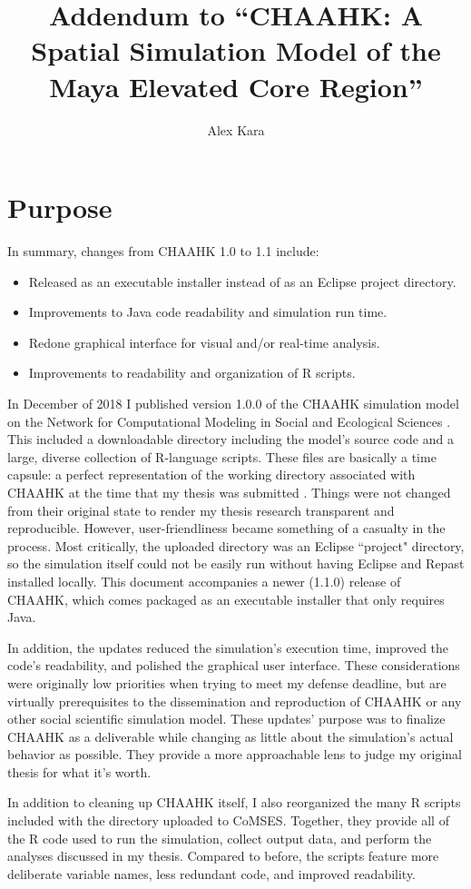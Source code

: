 \documentclass{article}
\title{Addendum to ``CHAAHK: A Spatial Simulation Model of the Maya
		Elevated Core Region''}
\author{Alex Kara}
\begin{document}
\maketitle
\section{Purpose}
In summary, changes from CHAAHK 1.0 to 1.1 include:
\begin{itemize}
	\item Released as an executable installer instead of as an Eclipse project directory.
	\item Improvements to Java code readability and simulation run time.
	\item Redone graphical interface for visual and/or real-time analysis.
	\item Improvements to readability and organization of R scripts.
\end{itemize}
\par In December of 2018 I published version 1.0.0 of the CHAAHK simulation model on the Network for Computational Modeling in Social and Ecological Sciences \cite{kara2018a}. This included a downloadable directory including the model's source code and a large, diverse collection of R-language scripts. These files are basically a time capsule: a perfect representation of the working directory associated with CHAAHK at the time that my thesis was submitted \cite{kara2018b}. Things were not changed from their original state to render my thesis research transparent and reproducible. However, user-friendliness became something of a casualty in the process. Most critically, the uploaded directory was an Eclipse ``project" directory, so the simulation itself could not be easily run without having Eclipse and Repast installed locally. This document accompanies a newer (1.1.0) release of CHAAHK, which comes packaged as an executable installer that only requires Java.
\par In addition, the updates reduced the simulation's execution time, improved the code's readability, and polished the graphical user interface. These considerations were originally low priorities when trying to meet my defense deadline, but are virtually prerequisites to the dissemination and reproduction of CHAAHK or any other social scientific simulation model.  These updates' purpose was to finalize CHAAHK as a deliverable while changing as little about the simulation's actual behavior as possible. They provide a more approachable lens to judge my original thesis for what it's worth. 
\par In addition to cleaning up CHAAHK itself, I also reorganized the many R scripts included with the directory uploaded to CoMSES. Together, they provide all of the R code used to run the simulation, collect output data, and perform the analyses discussed in my thesis. Compared to before, the scripts feature more deliberate variable names, less redundant code, and improved readability. 
\end{document}
